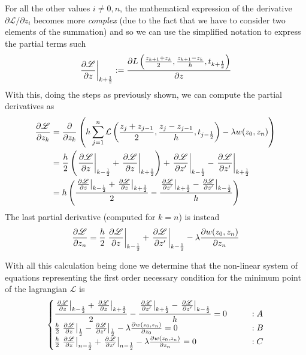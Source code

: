 	
	For all the other values $i\neq0,n$, the mathematical expression of the derivative $\partial\mathscr L / \partial z_i$ becomes more \textit{complex} (due to the fact that we have to consider two elements of the summation) and so we can use the simplified notation to express the partial terms such
	\[ \left. \frac{\partial \mathscr L}{\partial z} \right|_{k + \frac 1 2} :=  \frac{\partial L \left( \frac{z_{k+1}+z_k}2, \frac{z_{k+1}-z_k}h, t_{k+\frac 1 2} \right)}{\partial z} \]
	With this, doing the steps as previously shown, we can compute the partial derivatives as
	\begin{align*}
		\frac{\partial \mathscr L}{\partial z_k} &= \frac{\partial }{\partial z_k} \left(h \sum_{j=1}^{n} \mathcal L \left(\frac{z_j + z_{j-1}}{2},  \frac{z_j - z_{j-1}}{h}  , t_{j-\frac 1 2}   \right) - \lambda w(z_0,z_n) \right) \\
		& = \frac h 2 \left( \left. \frac{\partial \mathscr L}{\partial z} \right|_{k - \frac 1 2} + \left. \frac{\partial \mathscr L}{\partial z} \right|_{k + \frac 1 2}  \right) + \left. \frac{\partial \mathscr L}{\partial z'} \right|_{k - \frac 1 2} - \left. \frac{\partial \mathscr L}{\partial z'} \right|_{k + \frac 1 2} \\
		& = h \left(  \frac{\left. \frac{\partial \mathscr L}{\partial z} \right|_{k - \frac 1 2} + \left. \frac{\partial \mathscr L}{\partial z} \right|_{k + \frac 1 2}}{2} - \frac{\left. \frac{\partial \mathscr L}{\partial z'} \right|_{k + \frac 1 2} - \left. \frac{\partial \mathscr L}{\partial z'} \right|_{k - \frac 1 2}}{h} \right)
	\end{align*}	
	The last partial derivative (computed for $k=n$) is instead
	\[ \frac{\partial \mathscr L}{\partial z_n} = \frac h 2 \left. \frac{\partial \mathscr L}{\partial z} \right|_{k - \frac 1 2} + \left. \frac{\partial \mathscr L}{\partial z'} \right|_{k - \frac 1 2} - \lambda \frac{\partial w(z_0,z_n)}{\partial z_n}\]
	
	With all this calculation being done we determine that the non-linear system of equations representing the first order necessary condition for the minimum point of the lagrangian $\mathscr L$ is
	\[\begin{cases}
		\dfrac{\left. \frac{\partial \mathscr L}{\partial z} \right|_{k - \frac 1 2} + \left. \frac{\partial \mathscr L}{\partial z} \right|_{k + \frac 1 2}}{2} - \dfrac{\left. \frac{\partial \mathscr L}{\partial z'} \right|_{k + \frac 1 2} - \left. \frac{\partial \mathscr L}{\partial z'} \right|_{k - \frac 1 2}}{h} = 0 \qquad & : A  \\
		\frac h 2 \left. \frac{\partial \mathscr L}{\partial z} \right|_{\frac 1 2} - \left. \frac{\partial \mathscr L}{\partial z'} \right|_{\frac 1 2} - \lambda \frac{\partial w(z_0,z_n)}{\partial z_0} = 0&:B\\
		\frac h 2 \left. \frac{\partial \mathscr L}{\partial z} \right|_{n-\frac 1 2} + \left. \frac{\partial \mathscr L}{\partial z'} \right|_{n-\frac 1 2} - \lambda \frac{\partial w(z_0,z_n)}{\partial z_n} = 0 &:C
	\end{cases}\]
	
